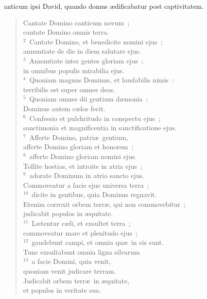 \bchapter
{}anticum ipsi David, quando domus \ae dificabatur post captivitatem. \begin{flushleft}\begin{verse}\vspace{6pt}Cantate Domino canticum novum~;\\ cantate Domino omnis terra.\\
${}^{2}$~Cantate Domino, et benedicite nomini ejus~;\\ annuntiate de die in diem salutare ejus.\\
${}^{3}$~Annuntiate inter gentes gloriam ejus~;\\ in omnibus populis mirabilia ejus.\\
${}^{4}$~Quoniam magnus Dominus, et laudabilis nimis~:\\ terribilis est super omnes deos.\\
${}^{5}$~Quoniam omnes dii gentium d\ae monia~;\\ Dominus autem c\ae los fecit.\\
${}^{6}$~Confessio et pulchritudo in conspectu ejus~;\\ sanctimonia et magnificentia in sanctificatione ejus.\\
${}^{7}$~Afferte Domino, patri\ae\ gentium,\\ afferte Domino gloriam et honorem~;\\
${}^{8}$~afferte Domino gloriam nomini ejus.\\ Tollite hostias, et introite in atria ejus~;\\
${}^{9}$~adorate Dominum in atrio sancto ejus.\\ Commoveatur a facie ejus universa terra~;\\
${}^{10}$~dicite in gentibus, quia Dominus regnavit.\\ Etenim correxit orbem terr\ae , qui non commovebitur~;\\ judicabit populos in \ae quitate.\\
${}^{11}$~L\ae tentur c\ae li, et exsultet terra~;\\ commoveatur mare et plenitudo ejus~;\\
${}^{12}$~gaudebunt campi, et omnia qu\ae\ in eis sunt.\\ Tunc exsultabunt omnia ligna silvarum\\
${}^{13}$~a facie Domini, quia venit,\\ quoniam venit judicare terram.\\ Judicabit orbem terr\ae\ in \ae quitate,\\ et populos in veritate sua.\end{verse}\end{flushleft}



